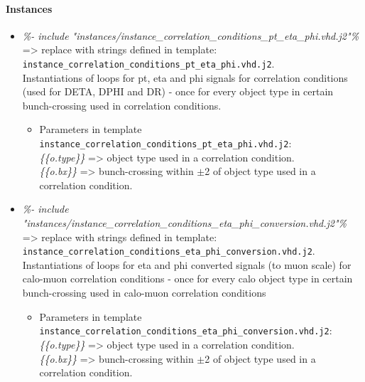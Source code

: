 \paragraph{Instances}
\begin{itemize}
\item \textit{{\%- include "instances/instance\_correlation\_conditions\_pt\_eta\_phi.vhd.j2"\%}} => replace with strings defined in template:\\
\texttt{instance\_correlation\_conditions\_pt\_eta\_phi.vhd.j2}.\\
Instantiations of loops for pt, eta and phi signals for correlation conditions (used for DETA, DPHI and DR) - once for every object type in certain bunch-crossing used in correlation conditions.
    \begin{itemize}
    \item Parameters in template\\ \texttt{instance\_correlation\_conditions\_pt\_eta\_phi.vhd.j2}:\\
    \textit{\{\{o.type\}\}} => object type used in a correlation condition.\\ 
    \textit{\{\{o.bx\}\}} => bunch-crossing within $\pm$2 of object type used in a correlation condition.\\
    \end{itemize}
\end{itemize}
\begin{itemize}
\item \textit{{\%- include "instances/instance\_correlation\_conditions\_eta\_phi\_conversion.vhd.j2"\%}} => replace with strings defined in template:\\
\texttt{instance\_correlation\_conditions\_eta\_phi\_conversion.vhd.j2}.\\
Instantiations of loops for eta and phi converted signals (to muon scale) for calo-muon correlation conditions - once for every calo object type in certain bunch-crossing used in calo-muon correlation conditions
    \begin{itemize}
    \item Parameters in template\\ \texttt{instance\_correlation\_conditions\_eta\_phi\_conversion.vhd.j2}:\\
    \textit{\{\{o.type\}\}} => object type used in a correlation condition.\\ 
    \textit{\{\{o.bx\}\}} => bunch-crossing within $\pm$2 of object type used in a correlation condition.\\
    \end{itemize}
\end{itemize}
